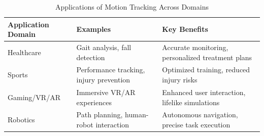 \newpage


\begin{table}[htb]
\centering
\caption{Applications of Motion Tracking Across Domains}
\label{tab:tab_1}
\begin{tabular}{| >{\centering\arraybackslash}m{3.5cm} | >{\centering\arraybackslash}m{4.5cm} | >{\centering\arraybackslash}m{5cm} |}
\toprule
\textbf{Application Domain}& \textbf{Examples} & \textbf{Key Benefits} \\
\midrule
Healthcare & Gait analysis, fall detection & Accurate monitoring, personalized treatment plans \\
\hline
Sports & Performance tracking, injury prevention & Optimized training, reduced injury risks \\
\hline
Gaming/VR/AR & Immersive VR/AR experiences & Enhanced user interaction, lifelike simulations \\
\hline
Robotics & Path planning, human-robot interaction & Autonomous navigation, precise task execution \\
\bottomrule
\end{tabular}
\end{table}

